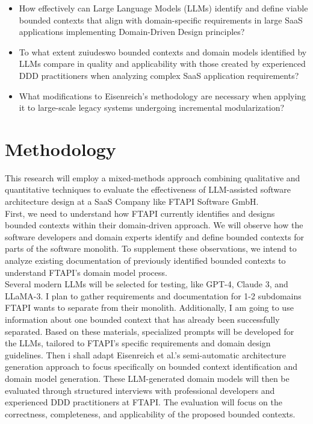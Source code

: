 \documentclass[12pt,a4paper]{article}
\begin{document}
\begin{itemize}
    \item How effectively can Large Language Models (LLMs) identify and define viable bounded contexts that align with domain-specific requirements in large SaaS applications implementing Domain-Driven Design principles?
    \item To what extent                                                               zuiudeswo bounded contexts and domain models identified by LLMs compare in quality and applicability with those created by experienced DDD practitioners when analyzing complex SaaS application requirements?
    \item What modifications to Eisenreich's methodology are necessary when applying it to large-scale legacy systems undergoing incremental modularization?
\end{itemize}



\section{Methodology}
This research will employ a mixed-methods approach combining qualitative and quantitative techniques to evaluate the effectiveness of LLM-assisted software architecture design at a SaaS Company like FTAPI Software GmbH.\\ First, we need to understand how FTAPI currently identifies and designs bounded contexts within their domain-driven approach. We will observe how the software developers and domain experts identify and define bounded contexts for parts of the software monolith. To supplement these observations, we intend to analyze existing documentation of previously identified bounded contexts to understand FTAPI's domain model process. \\ Several modern LLMs will be selected for testing, like GPT-4, Claude 3, and LLaMA-3. I plan to gather requirements and documentation for 1-2 subdomains FTAPI wants to separate from their monolith. Additionally, I am going to use information about one bounded context that has already been successfully separated. Based on these materials, specialized prompts will be developed for the LLMs, tailored to FTAPI's specific requirements and domain design guidelines. Then i shall adapt Eisenreich et al.'s semi-automatic architecture generation approach to focus specifically on bounded context identification and domain model generation. These LLM-generated domain models will then be evaluated through structured interviews with professional developers and experienced DDD practitioners at FTAPI. The evaluation will focus on the correctness, completeness, and applicability of the proposed bounded contexts.

\printbibliography
\end{document}
